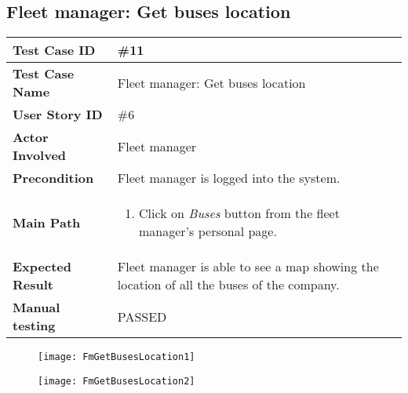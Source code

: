 \subsection{Fleet manager: Get buses location}
\begin{center}
	\begin{tabular} { | m{3.5cm} | m{9.5cm} | }
		\hline
		\textbf{Test Case ID} & \#11\\
		\hline
		\textbf{Test Case Name} & Fleet manager: Get buses location\\
		\hline
		\textbf{User Story ID} & \#6 \\
		\hline
		\textbf{Actor Involved} & Fleet manager\\
		\hline
		\textbf{Precondition} & Fleet manager is logged into the system.\\
		\hline
		\textbf{Main Path} & 
		\begin{enumerate}
			\item Click on \textit{Buses} button from the fleet manager's personal page.
		\end{enumerate}\\
		\hline
		\textbf{Expected Result} & Fleet manager is able to see a map showing the location of all the buses of the company.\\
		\hline
	\textbf{Manual testing} & PASSED\\
	\hline
\end{tabular}
\end{center}
\begin{figure}[H]
\centering
\texttt{[image: FmGetBusesLocation1]}
\end{figure}
\begin{figure}[H]
\centering
\texttt{[image: FmGetBusesLocation2]}
\end{figure}
\newpage
